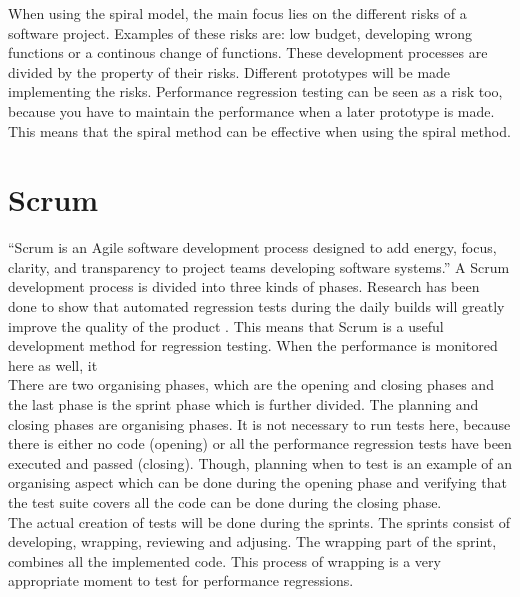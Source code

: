 When using the spiral model, the main focus lies on the different risks of a software project. Examples of these risks are: low budget, developing wrong functions or a continous change of functions. These development processes are divided by the property of their risks. Different prototypes will be made implementing the risks. Performance regression testing can be seen as a risk too, because you have to maintain the performance when a later prototype is made. This means that the spiral method can be effective when using the spiral method.

\section{Scrum}
``Scrum is an Agile software development process designed to add energy, focus, clarity, and transparency to project teams developing software systems.''\cite{sutherland2007distributed} A Scrum development process is divided into three kinds of phases. Research has been done to show that automated regression tests during the daily builds will greatly improve the quality of the product \cite{Future_of_Scrum}. This means that Scrum is a useful development method for regression testing. When the performance is monitored here as well, it  \\ There are two organising phases, which are the opening and closing phases and the last phase is the sprint phase which is further divided. The planning and closing phases are organising phases. It is not necessary to run tests here, because there is either no code (opening) or all the performance regression tests have been executed and passed (closing). Though, planning when to test is an example of an organising aspect which can be done during the opening phase and verifying that the test suite covers all the code can be done during the closing phase. \\ The actual creation of tests will be done during the sprints. The sprints consist of developing, wrapping, reviewing and adjusing. The wrapping part of the sprint, combines all the implemented code. This process of wrapping is a very appropriate moment to test for performance regressions. \\

